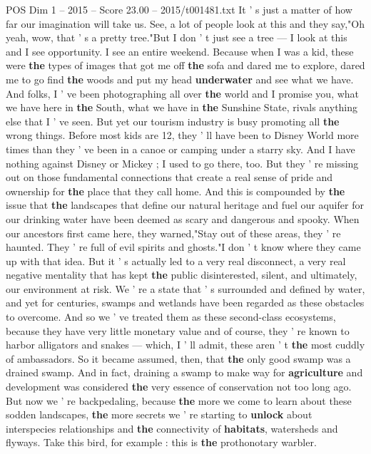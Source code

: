 \begin{textsample}{POS Dim 1 – 2015 – Score 23.00 – 2015/t001481.txt}
It ' s just a matter of how far our imagination will take us.
See, a lot of people look at this and they say,"Oh yeah, wow, that ' s a pretty tree."But I don ' t just see a tree — I look at this and I see opportunity.
I see an entire weekend.
Because when I was a kid, these were \textbf{the} types of images that got me off \textbf{the} sofa and dared me to explore, dared me to go find \textbf{the} woods and put my head \textbf{underwater} and see what we have.
And folks, I ' ve been photographing all over \textbf{the} world and I promise you, what we have here in \textbf{the} South, what we have in \textbf{the} Sunshine State, rivals anything else that I ' ve seen.
But yet our tourism industry is busy promoting all \textbf{the} wrong things.
Before most kids are 12, they ' ll have been to Disney World more times than they ' ve been in a canoe or camping under a starry sky.
And I have nothing against Disney or Mickey ; I used to go there, too.
But they ' re missing out on those fundamental connections that create a real sense of pride and ownership for \textbf{the} place that they call home.
And this is compounded by \textbf{the} issue that \textbf{the} landscapes that define our natural heritage and fuel our aquifer for our drinking water have been deemed as scary and dangerous and spooky.
When our ancestors first came here, they warned,"Stay out of these areas, they ' re haunted.
They ' re full of evil spirits and ghosts."I don ' t know where they came up with that idea.
But it ' s actually led to a very real disconnect, a very real negative mentality that has kept \textbf{the} public disinterested, silent, and ultimately, our environment at risk.
We ' re a state that ' s surrounded and defined by water, and yet for centuries, swamps and wetlands have been regarded as these obstacles to overcome.
And so we ' ve treated them as these second-class ecosystems, because they have very little monetary value and of course, they ' re known to harbor alligators and snakes — which, I ' ll admit, these aren ' t \textbf{the} most cuddly of ambassadors.
So it became assumed, then, that \textbf{the} only good swamp was a drained swamp.
And in fact, draining a swamp to make way for \textbf{agriculture} and development was considered \textbf{the} very essence of conservation not too long ago.
But now we ' re backpedaling, because \textbf{the} more we come to learn about these sodden landscapes, \textbf{the} more secrets we ' re starting to \textbf{unlock} about interspecies relationships and \textbf{the} connectivity of \textbf{habitats}, watersheds and flyways.
Take this bird, for example : this is \textbf{the} prothonotary warbler.

\end{textsample}
